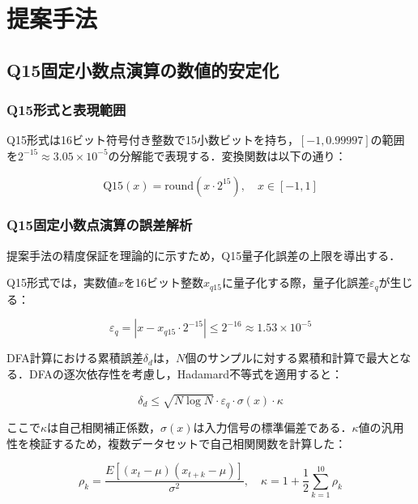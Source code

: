 \documentclass[paper]{ieicej}
\begin{document}
\section{提案手法}

\subsection{Q15固定小数点演算の数値的安定化}

\subsubsection{Q15形式と表現範囲}
Q15形式は16ビット符号付き整数で15小数ビットを持ち，$[-1, 0.99997]$の範囲を$2^{-15} \approx 3.05 \times 10^{-5}$の分解能で表現する．変換関数は以下の通り：

\begin{equation}
\text{Q15}(x) = \text{round}(x \cdot 2^{15}), \quad x \in [-1, 1]
\end{equation}

\subsubsection{Q15固定小数点演算の誤差解析}
提案手法の精度保証を理論的に示すため，Q15量子化誤差の上限を導出する．

Q15形式では，実数値$x$を16ビット整数$x_{q15}$に量子化する際，量子化誤差$\varepsilon_q$が生じる：

\begin{equation}
\varepsilon_q = |x - x_{q15} \cdot 2^{-15}| \leq 2^{-16} \approx 1.53 \times 10^{-5}
\end{equation}

DFA計算における累積誤差$\delta_d$は，$N$個のサンプルに対する累積和計算で最大となる．DFAの逐次依存性を考慮し，Hadamard不等式を適用すると：

\begin{equation}
\delta_d \leq \sqrt{N \log N} \cdot \varepsilon_q \cdot \sigma(x) \cdot \kappa
\end{equation}

ここで$\kappa$は自己相関補正係数，$\sigma(x)$は入力信号の標準偏差である．$\kappa$値の汎用性を検証するため，複数データセットで自己相関関数を計算した：

\begin{equation}
\rho_k = \frac{E[(x_t - \mu)(x_{t+k} - \mu)]}{\sigma^2}, \quad \kappa = 1 + \frac{1}{2}\sum_{k=1}^{10}\rho_k
\end{equation}
\end{document}
